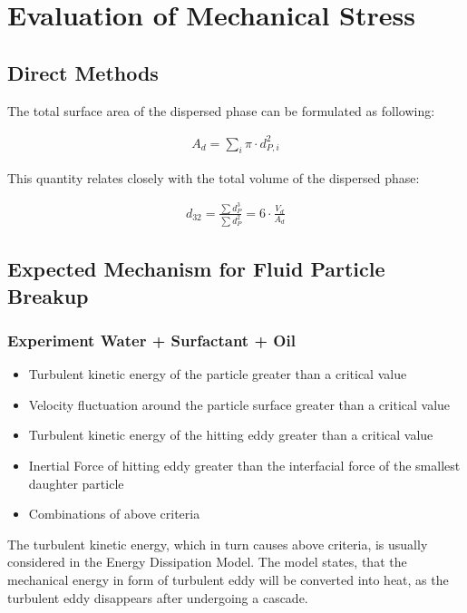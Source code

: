 \section{Evaluation of Mechanical Stress}

\subsection{Direct Methods}

The total surface area of the dispersed phase can be formulated as following:

\begin{align}
	A_d = \sum_i \pi \cdot d_{P,i}^2
\end{align}

This quantity relates closely with the total volume of the dispersed phase:

\begin{align}
	d_{32} = \frac{\sum d_P^3}{\sum d_P^2} = 6 \cdot \frac{V_d}{A_d}
\end{align}




\subsection{Expected Mechanism for Fluid Particle Breakup}

\subsubsection{Experiment Water + Surfactant + Oil} \label{sec:expWaterSurfOil}
\begin{itemize}
	\item Turbulent kinetic energy of the particle greater than a critical value
	\item Velocity fluctuation around the particle surface greater than a critical value
	\item Turbulent kinetic energy of the hitting eddy greater than a critical value
	\item Inertial Force of hitting eddy greater than the interfacial force of the smallest daughter particle
	\item Combinations of above criteria
\end{itemize}
The turbulent kinetic energy, which in turn causes above criteria, is usually considered in the Energy Dissipation Model. The model states, that the mechanical energy in form of turbulent eddy will be converted into heat, as the turbulent eddy disappears after undergoing a cascade.

